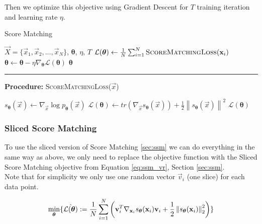 Then we optimize this objective using Gradient Descent for $T$ training iteration and learning rate $\eta$.  

\begin{algorithm}
    \caption{Score Matching}
    \begin{algorithmic}[1]  
        \Require $\vec X = \{\vec x_1, \vec x_2, ..., \vec x_N\}$, $\boldsymbol{\theta}$, $\eta$, $T$
            \State $\mathcal{L}(\boldsymbol{\theta}) \gets \frac{1}{N} \sum_{i=1}^N \textsc{ScoreMatchingLoss}(\vec x_i)$
            \State $\boldsymbol{\theta} \gets \boldsymbol{\theta} - \eta \nabla_{\boldsymbol{\theta}} \mathcal{L}(\boldsymbol{\theta})$
        \EndFor
        \State \Return $\boldsymbol{\theta}$
        \end{algorithmic}
        \noindent\rule{\linewidth}{0.4pt}
        \textbf{Procedure:} \textsc{ScoreMatchingLoss}($\vec x$)
        \begin{algorithmic}[1]
            \State $s_{\boldsymbol{\theta}}(\vec x) \gets \nabla_{\vec x} \log p_{\boldsymbol{\theta}}(\vec x)$
            \State $\mathcal{L}(\boldsymbol{\theta}) \gets tr(\nabla_{\vec x} s_{\boldsymbol{\theta}}(\vec x)) + \frac{1}{2} \left\| s_{\boldsymbol{\theta}}(\vec x) \right\|^2 $
            \State \Return $\mathcal{L}(\boldsymbol{\theta})$
        \end{algorithmic}
\end{algorithm}

\subsubsection{Sliced Score Matching}
\label{sec:gmm_ssm}

To use the sliced version of Score Matching \ref{sec:ssm} we can do everything in the same way as above, we only need to replace 
the objective function with the Sliced Score Matching objective from Equation \ref{eq:ssm_vr}, Section \ref{sec:ssm}. \\
Note that for simplicity we only use one random vector $\vec v_i$ (one slice) for each data point. 

\begin{equation}
    \min_{\substack{\boldsymbol{\theta}}} \{ \hat{\mathcal{L}(\boldsymbol{\theta})} := \frac{1}{N} \sum_{i=1}^{N} \left( \vec{v}_i^T \nabla_{\vec x_i} s_{\boldsymbol{\theta}}(\vec x_i) \vec{v}_i + \frac{1}{2} \norm{  s_{\boldsymbol{\theta}}(\vec x_i) }^2_2 \right) \}
    \label{eq:ssm_optimization_problem}
\end{equation}

